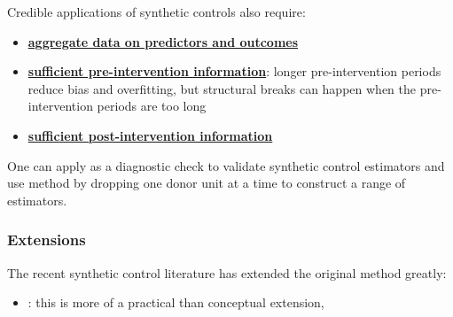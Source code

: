 \documentclass[twoside]{article}
\begin{document}
Credible applications of synthetic controls also require:
\begin{itemize}
    \item \underline{\textbf{aggregate data on predictors and outcomes}}
    \item \underline{\textbf{sufficient pre-intervention information}}: longer pre-intervention periods reduce bias and overfitting, but structural breaks can happen when the pre-intervention periods are too long 
    \item \underline{\textbf{sufficient post-intervention information}}
\end{itemize}
One can apply  as a diagnostic check to validate synthetic control estimators and use  method by dropping one donor unit at a time to construct a range of estimators.

\subsubsection{Extensions}
The recent synthetic control literature has extended the original method greatly:
\begin{itemize}
    \item {}: this is more of a practical than conceptual extension, 
\end{itemize}


\newpage


\end{document}
